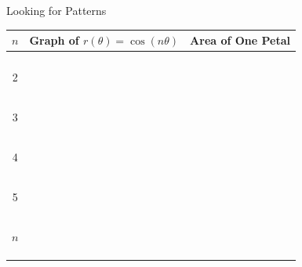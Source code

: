 \begin{exercise}{Looking for Patterns \Coffeecup \Coffeecup \Coffeecup}
\begin{center}
\vspace{.5in}

\begin{longtable}{|c|c|c|} \hline
$n$ & \hspace{1in} Graph of $r(\theta)=\cos(n\theta)$ \hspace{1in} & Area of One Petal \\ \hline
& & \\
& & \\
& & \\
& & \\
2 &  & \\ 
  & & \\
  & & \\
  & & \\
  & & \\
  & & \\
3 &  & \\ 
& & \\
& & \\
& & \\
& & \\
& & \\
4 & & \\  
& & \\
& & \\
& & \\
& & \\
& & \\
5 &  & \\  
& & \\
& & \\
& & \\
& & \\
& & \\
$n$ &  & \\  
& & \\
& & \\
& & \\ 
\hline 
\end{longtable}
\end{center}

\end{exercise}

